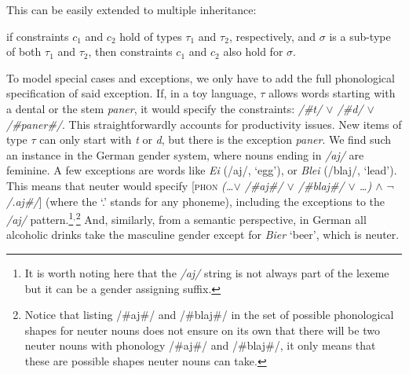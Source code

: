 This can be easily extended to multiple inheritance:

\begin{exe}
    \ex if constraints $c_1$ and $c_2$ hold of types $\tau_1$ and $\tau_2$, respectively, and $\sigma$ is a sub-type of both $\tau_1$ and $\tau_2$, then constraints $c_1$ and $c_2$ also hold for $\sigma$.
\end{exe}

To model special cases and exceptions, we only have to add the full phonological specification of said exception. If, in a toy language, $\tau$ allows words starting with a dental or the stem \textit{paner}, it would specify the constraints: \textit{/\#t/ $\lor$ /\#d/ $\lor$ /\#paner\#/}. This straightforwardly accounts for productivity issues. New items of type $\tau$ can only start with \textit{t} or \textit{d}, but there is the exception \textit{paner}. We find such an instance in the German gender system, where nouns ending in \textit{/aj/} are feminine. A few exceptions are words like \textit{Ei} (/aj/, `egg'), or \textit{Blei} (/blaj/, `lead'). This means that neuter would specify [\textsc{phon} \textit{(\dots  $\lor$ /\#aj\#/ $\lor$ /\#blaj\#/ $\lor$ \dots) $\land$ $\lnot$/.aj\#/}] (where the `.' stands for any phoneme), including the exceptions to the \textit{/aj/} pattern.\footnote{It is worth noting here that the \textit{/aj/} string is not always part of the lexeme but it can be a gender assigning suffix.}$^{,}$\footnote{Notice that listing /\#aj\#/ and /\#blaj\#/ in the set of possible phonological shapes for neuter nouns does not ensure on its own that there will be two neuter nouns with phonology /\#aj\#/ and /\#blaj\#/, it only means that these are possible shapes neuter nouns can take.} And, similarly, from a semantic perspective, in German all alcoholic drinks take the masculine gender except for \textit{Bier} `beer', which is neuter.

